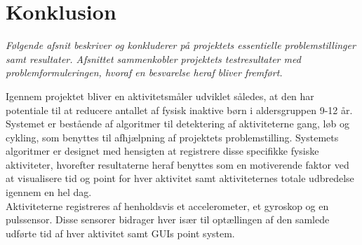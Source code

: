 \section{Konklusion}
\textit{Følgende afsnit beskriver og konkluderer på projektets essentielle problemstillinger samt resultater. Afsnittet sammenkobler projektets testresultater med problemformuleringen, hvoraf en besvarelse heraf bliver fremført.}

Igennem projektet bliver en aktivitetsmåler udviklet således, at den har potentiale til at reducere antallet af fysisk inaktive børn i aldersgruppen 9-12 år. Systemet er bestående af algoritmer til detektering af aktiviteterne gang, løb og cykling, som benyttes til afhjælpning af projektets problemstilling. Systemets algoritmer er designet med hensigten at registrere disse specifikke fysiske aktiviteter, hvorefter resultaterne heraf benyttes som en motiverende faktor ved at visualisere tid og point for hver aktivitet samt aktiviteternes totale udbredelse igennem en hel dag. \\
Aktiviteterne registreres af henholdsvis et accelerometer, et gyroskop og en pulssensor. Disse sensorer bidrager hver især til optællingen af den samlede udførte tid af hver aktivitet samt GUIs point system. %

